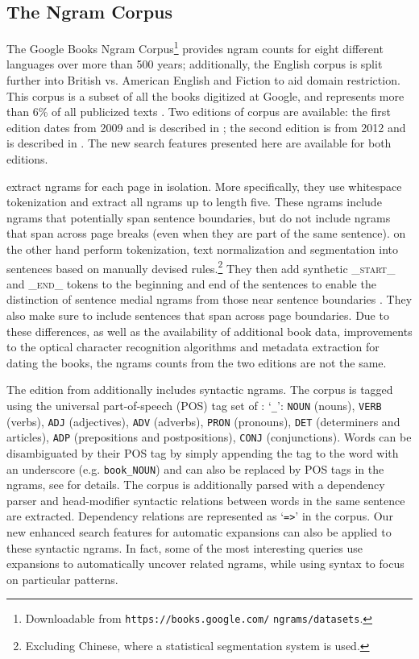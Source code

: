 \documentclass[11pt,a4paper]{article}
\newcommand{\query}[1]{\texttt{#1}}
\begin{document}
\subsection{The Ngram Corpus}
	The Google Books Ngram Corpus\footnote{Downloadable from \texttt{https://books.google.com/} \texttt{ngrams/datasets}.} provides ngram counts for eight different languages over more than 500 years; additionally, the English corpus is split further into British vs. American English and Fiction to aid domain restriction. This corpus is a subset of all the books digitized at Google, and represents more than 6\% of all publicized texts \cite{lin2012syntactic}. Two editions of corpus are available: the first edition dates from 2009 and is described in ; the second edition is from 2012 and is described in . The new search features presented here are available for both editions.

 extract ngrams for each page in isolation. More specifically, they use whitespace tokenization and extract all ngrams up to length five. These ngrams include ngrams that potentially span sentence boundaries, but do not include ngrams that span across page breaks (even when they are part of the same sentence).
 on the other hand perform tokenization, text normalization and segmentation into sentences based on manually devised rules.\footnote{Excluding Chinese, where a statistical segmentation system is used.} They then add synthetic \textsf{\textsc{\_start\_}} and \textsf{\textsc{\_end\_}} tokens to the beginning and end of the sentences to enable the distinction of sentence medial ngrams from those near sentence boundaries \cite{lin2012syntactic}. They also make sure to include sentences that span across page boundaries. Due to these differences, as well as the availability of additional book data, improvements to the optical character recognition algorithms and metadata extraction for dating the books, the ngrams counts from the two editions are not the same.

The edition from  additionally includes syntactic ngrams. The corpus is tagged using the universal part-of-speech (POS) tag set of : `\query{\_}': \query{NOUN} (nouns), \query{VERB} (verbs), \query{ADJ} (adjectives), \query{ADV} (adverbs), \query{PRON} (pronouns), \query{DET} (determiners and articles), \query{ADP} (prepositions and postpositions), \query{CONJ} (conjunctions). Words can be disambiguated by their POS tag by simply appending the tag to the word with an underscore (e.g. \texttt{book\_NOUN}) and can also be replaced by POS tags in the ngrams, see  for details. The corpus is additionally parsed with a dependency parser and head-modifier syntactic relations between words in the same sentence are extracted. Dependency relations are represented as `\query{=>}' in the corpus. Our new enhanced search features for automatic expansions can also be applied to these syntactic ngrams. In fact, some of the most interesting queries use expansions to automatically uncover related ngrams, while using syntax to focus on particular patterns.
\end{document}
